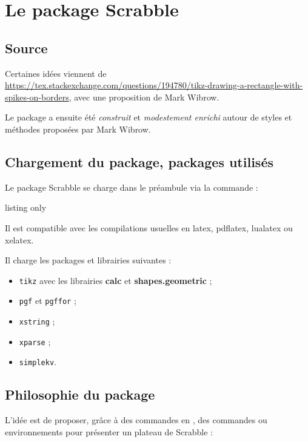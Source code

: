 \documentclass{article}
\newcommand\Cle[1]{{\bfseries\sffamily\textlangle #1\textrangle}}
\begin{document}
\section{Le package Scrabble}

\subsection{Source}

Certaines idées viennent de \url{https://tex.stackexchange.com/questions/194780/tikz-drawing-a-rectangle-with-spikes-on-borders}, avec une proposition de Mark Wibrow.

\smallskip

Le package a ensuite été \textit{construit} et \textit{modestement enrichi} autour de styles et méthodes proposées par Mark Wibrow.

\subsection{Chargement du package, packages utilisés}

Le package \textsf{Scrabble} se charge dans le préambule via la commande :

\begin{PresentationCode}{listing only}
\usepackage{Scrabble}
\end{PresentationCode}

Il est compatible avec les compilations usuelles en \textsf{latex}, \textsf{pdflatex}, \textsf{lualatex} ou \textsf{xelatex}.

\medskip

Il charge les packages et librairies suivantes :

\begin{itemize}
	\item \texttt{tikz} avec les librairies \Cle{calc} et \Cle{shapes.geometric} ;
	\item \texttt{pgf} et \texttt{pgffor} ;
	\item \texttt{xstring} ;
	\item \texttt{xparse} ;
	\item \texttt{simplekv}.
\end{itemize}

\subsection{\og Philosophie \fg{} du package}

L'idée est de proposer, grâce à des commandes en \TikZ, des commandes ou environnements pour présenter un plateau de Scrabble\texttrademark{} :
\end{document}
